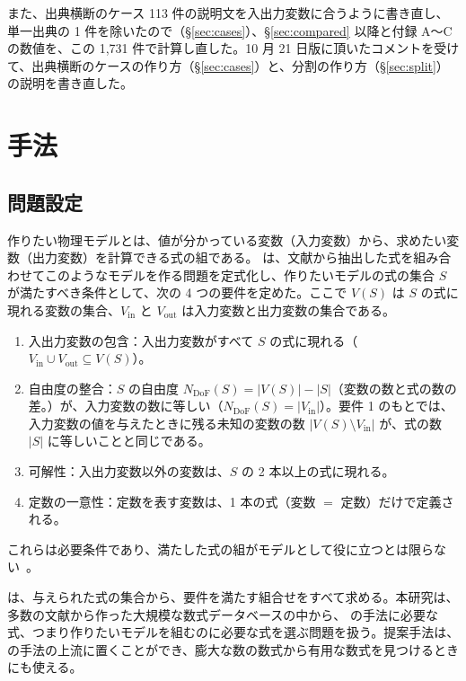 \documentclass[11pt,a4paper]{ltjsarticle}
\newcommand{\Vin}{V_{\mathrm{in}}}
\newcommand{\Vout}{V_{\mathrm{out}}}
\newcommand{\Ndof}{N_{\mathrm{DoF}}}
\begin{document}
また、出典横断のケース 113 件の説明文を入出力変数に合うように書き直し、単一出典の 1 件を除いたので（\S\ref{sec:cases}）、\S\ref{sec:compared} 以降と付録 A〜C の数値を、この 1{,}731 件で計算し直した。10 月 21 日版に頂いたコメントを受けて、出典横断のケースの作り方（\S\ref{sec:cases}）と、分割の作り方（\S\ref{sec:split}）の説明を書き直した。

\section{手法}\label{sec:method}
\subsection{問題設定}\label{sec:problem}
作りたい物理モデルとは、値が分かっている変数（入力変数）から、求めたい変数（出力変数）を計算できる式の組である。\citet{CombineEq} は、文献から抽出した式を組み合わせてこのようなモデルを作る問題を定式化し、作りたいモデルの式の集合 $S$ が満たすべき条件として、次の 4 つの要件を定めた。ここで $V(S)$ は $S$ の式に現れる変数の集合、$\Vin$ と $\Vout$ は入力変数と出力変数の集合である。
\begin{enumerate}[leftmargin=2.2em]
  \item 入出力変数の包含：入出力変数がすべて $S$ の式に現れる（$\Vin \cup \Vout \subseteq V(S)$）。
  \item 自由度の整合：$S$ の自由度 $\Ndof(S) = |V(S)| - |S|$（変数の数と式の数の差。\citealp{Seborg}）が、入力変数の数に等しい（$\Ndof(S) = |\Vin|$）。要件 1 のもとでは、入力変数の値を与えたときに残る未知の変数の数 $|V(S) \setminus \Vin|$ が、式の数 $|S|$ に等しいことと同じである。
  \item 可解性：入出力変数以外の変数は、$S$ の 2 本以上の式に現れる。
  \item 定数の一意性：定数を表す変数は、1 本の式（変数 $=$ 定数）だけで定義される。
\end{enumerate}
これらは必要条件であり、満たした式の組がモデルとして役に立つとは限らない~\citep{CombineEq}。

\citet{CombineEq} は、与えられた式の集合から、要件を満たす組合せをすべて求める。本研究は、多数の文献から作った大規模な数式データベースの中から、\citet{CombineEq} の手法に必要な式、つまり作りたいモデルを組むのに必要な式を選ぶ問題を扱う。提案手法は、\citet{CombineEq} の手法の上流に置くことができ、膨大な数の数式から有用な数式を見つけるときにも使える。
\end{document}
